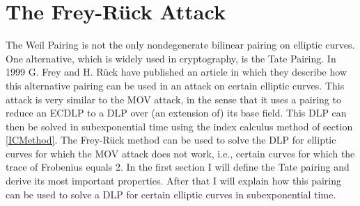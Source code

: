 \documentclass{article}
\numberwithin{equation}{section}
\theoremstyle{definition}
\begin{document}
\section{The Frey-R\"uck Attack}\label{Frey-Ruck}
The Weil Pairing is not the only nondegenerate bilinear pairing on elliptic curves. One alternative, which is widely used in cryptography, is the Tate Pairing. In 1999 G. Frey and H. R\"uck have published an article \cite{freyruck} in which they describe how this alternative pairing can be used in an attack on certain elliptic curves. This attack is very similar to the MOV attack, in the sense that it uses a pairing to reduce an ECDLP to a DLP over (an extension of) its base field. This DLP can then be solved in subexponential time using the index calculus method of section \ref{ICMethod}. The Frey-R\"uck method can be used to solve the DLP for elliptic curves for which the MOV attack does not work, i.e., certain curves for which the trace of Frobenius equals 2. In the first section I will define the Tate pairing and derive its most important properties. After that I will explain how this pairing can be used to solve a DLP for certain elliptic curves in subexponential time.
\end{document}
